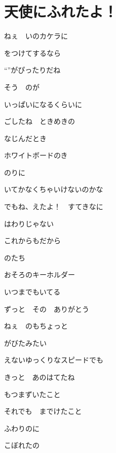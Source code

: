 \section{天使にふれたよ！}

ねぇ　いのカケラに

をつけてするなら

“”がぴったりだね

\bigskip

そう　のが

いっぱいになるくらいに

ごしたね　ときめきの

\bigskip

なじんだとき

ホワイトボードのき

のりに

いてかなくちゃいけないのかな

\bigskip

でもね、えたよ！　すてきなに

はわりじゃない

これからもだから

のたち

おそろのキーホルダー

いつまでもいてる

ずっと　その　ありがとう

\bigskip

ねぇ　のもちょっと

がびたみたい

えないゆっくりなスピードでも

きっと　あのはてたね

\bigskip

もつまずいたこと

それでも　までけたこと

ふわりのに

こぼれたの

